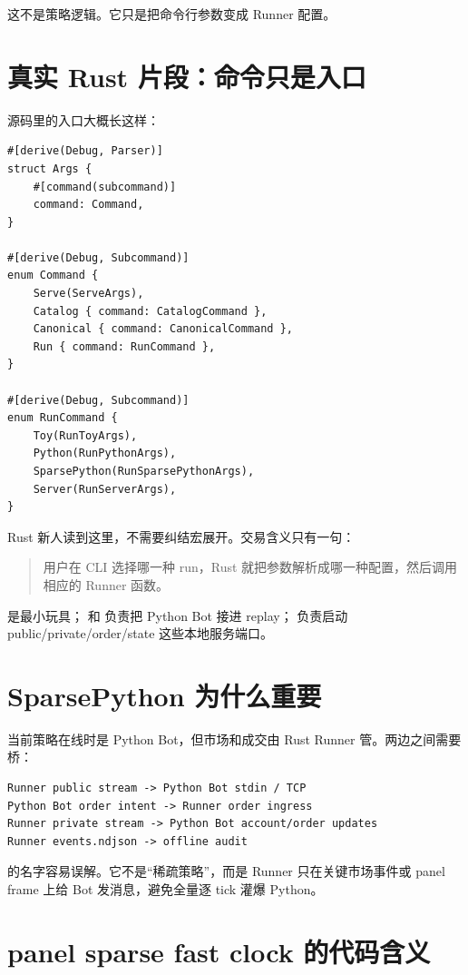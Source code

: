 这不是策略逻辑。它只是把命令行参数变成 Runner 配置。

\section{真实 Rust 片段：命令只是入口}

源码里的入口大概长这样：

\begin{lstlisting}
#[derive(Debug, Parser)]
struct Args {
    #[command(subcommand)]
    command: Command,
}

#[derive(Debug, Subcommand)]
enum Command {
    Serve(ServeArgs),
    Catalog { command: CatalogCommand },
    Canonical { command: CanonicalCommand },
    Run { command: RunCommand },
}

#[derive(Debug, Subcommand)]
enum RunCommand {
    Toy(RunToyArgs),
    Python(RunPythonArgs),
    SparsePython(RunSparsePythonArgs),
    Server(RunServerArgs),
}
\end{lstlisting}

Rust 新人读到这里，不需要纠结宏展开。交易含义只有一句：

\begin{quote}
用户在 CLI 选择哪一种 run，Rust 就把参数解析成哪一种配置，然后调用相应的 Runner 函数。
\end{quote}

 是最小玩具； 和  负责把 Python Bot 接进 replay； 负责启动 public/private/order/state 这些本地服务端口。

\section{SparsePython 为什么重要}

当前策略在线时是 Python Bot，但市场和成交由 Rust Runner 管。两边之间需要桥：

\begin{lstlisting}
Runner public stream -> Python Bot stdin / TCP
Python Bot order intent -> Runner order ingress
Runner private stream -> Python Bot account/order updates
Runner events.ndjson -> offline audit
\end{lstlisting}

 的名字容易误解。它不是“稀疏策略”，而是 Runner 只在关键市场事件或 panel frame 上给 Bot 发消息，避免全量逐 tick 灌爆 Python。

\section{panel sparse fast clock 的代码含义}

